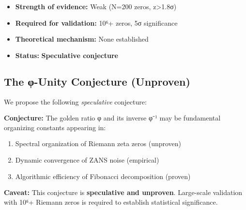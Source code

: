 \begin{itemize}
    \item \textbf{Strength of evidence:} Weak (N=200 zeros, z>1.8σ)
    \item \textbf{Required for validation:} 10⁶+ zeros, 5σ significance
    \item \textbf{Theoretical mechanism:} None established
    \item \textbf{Status:} \textbf{Speculative conjecture}
\end{itemize}

\subsection{The φ-Unity Conjecture (Unproven)}

We propose the following \textit{speculative} conjecture:

\vspace{0.2cm}
\textbf{Conjecture:} The golden ratio φ and its inverse φ⁻¹ may be fundamental organizing constants appearing in:
\begin{enumerate}
    \item Spectral organization of Riemann zeta zeros (unproven)
    \item Dynamic convergence of ZANS noise (empirical)
    \item Algorithmic efficiency of Fibonacci decomposition (proven)
\end{enumerate}

\vspace{0.2cm}
\textbf{Caveat:} This conjecture is \textbf{speculative and unproven}. Large-scale validation with 10⁶+ Riemann zeros is required to establish statistical significance.
